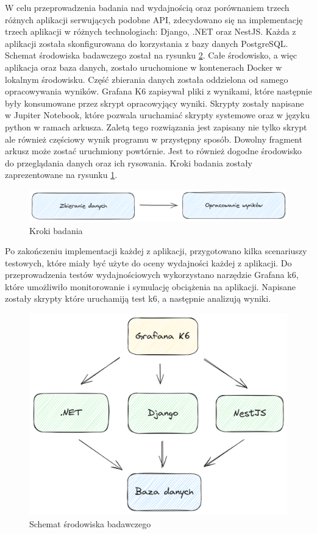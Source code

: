 W celu przeprowadzenia badania nad wydajnością oraz porównaniem trzech różnych aplikacji serwujących podobne API, zdecydowano się na implementację trzech aplikacji w różnych technologiach: Django, .NET oraz NestJS.
Każda z aplikacji została skonfigurowana do korzystania z bazy danych PostgreSQL. Schemat środowiska badawczego został na rysunku \ref{rys:docker_schema}.
Całe środowisko, a więc aplikacja oraz baza danych, zostało uruchomione w kontenerach Docker w lokalnym środowisku.
Część zbierania danych została oddzielona od samego opracowywania wyników.
Grafana K6 zapisywał pliki z wynikami, które następnie były konsumowane przez skrypt opracowyjący wyniki.
Skrypty zostały napisane w Jupiter Notebook, które pozwala uruchamiać skrypty systemowe oraz w języku python w ramach arkusza.
Zaletą tego rozwiązania jest zapisany nie tylko skrypt ale również częściowy wynik programu w przystępny sposób.
Dowolny fragment arkusz może zostać uruchmiony powtórnie.
Jest to również dogodne środowisko do przeglądania danych oraz ich rysowania.
Kroki badania zostały zaprezentowane na rysunku \ref{rys:test_flow}.


\begin{figure}[!hb]
	\centering \includegraphics[width=1\linewidth]{rysunki/test_flow.png}
	\caption{Kroki badania}
	\label{rys:test_flow}
\end{figure}

Po zakończeniu implementacji każdej z aplikacji, przygotowano kilka scenariuszy testowych, które miały być użyte do oceny wydajności każdej z aplikacji.
Do przeprowadzenia testów wydajnościowych wykorzystano narzędzie Grafana k6, które umożliwiło monitorowanie i symulację obciążenia na aplikacji.
Napisane zostały skrypty które uruchamiją test k6, a następnie analizują wyniki.

\begin{figure}[!hb]
	\centering \includegraphics[width=1\linewidth]{rysunki/framework_benchmark_schema.png}
	\caption{Schemat środowiska badawczego}
	\label{rys:docker_schema}
\end{figure}

